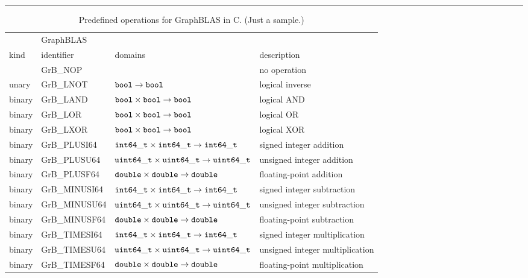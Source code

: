 \documentclass[11pt]{extarticle}
\begin{document}
\begin{table}
\hrule
\begin{center}
\caption{Predefined operations for GraphBLAS in C. (Just a sample.)
}
\label{Tab:PredefinedOperations}
\begin{tabular}{l|l|l|l}
		& GraphBLAS		&									& \\
kind		& identifier 		& domains								& description \\ \hline
		& {\sf GrB\_NOP}	& 									& no operation \\
unary		& {\sf GrB\_LNOT}	& ${\tt bool} \rightarrow {\tt bool}$      				& logical inverse \\
binary		& {\sf GrB\_LAND}	& ${\tt bool} \times {\tt bool} \rightarrow {\tt bool}$      		& logical AND \\
binary		& {\sf GrB\_LOR}	& ${\tt bool} \times {\tt bool} \rightarrow {\tt bool}$      		& logical OR \\
binary		& {\sf GrB\_LXOR}	& ${\tt bool} \times {\tt bool} \rightarrow {\tt bool}$      		& logical XOR \\
binary		& {\sf GrB\_PLUSI64}	& ${\tt int64\_t} \times {\tt int64\_t} \rightarrow {\tt int64\_t}$ 	& signed integer addition \\
binary		& {\sf GrB\_PLUSU64}	& ${\tt uint64\_t} \times {\tt uint64\_t} \rightarrow {\tt uint64\_t}$ 	& unsigned integer addition \\
binary		& {\sf GrB\_PLUSF64}	& ${\tt double} \times {\tt double} \rightarrow {\tt double}$ 		& floating-point addition \\
binary		& {\sf GrB\_MINUSI64}	& ${\tt int64\_t} \times {\tt int64\_t} \rightarrow {\tt int64\_t}$ 	& signed integer subtraction \\
binary		& {\sf GrB\_MINUSU64}	& ${\tt uint64\_t} \times {\tt uint64\_t} \rightarrow {\tt uint64\_t}$ 	& unsigned integer subtraction \\
binary		& {\sf GrB\_MINUSF64}	& ${\tt double} \times {\tt double} \rightarrow {\tt double}$ 		& floating-point subtraction \\
binary		& {\sf GrB\_TIMESI64}	& ${\tt int64\_t} \times {\tt int64\_t} \rightarrow {\tt int64\_t}$ 	& signed integer multiplication \\
binary		& {\sf GrB\_TIMESU64}	& ${\tt uint64\_t} \times {\tt uint64\_t} \rightarrow {\tt uint64\_t}$ 	& unsigned integer multiplication \\
binary		& {\sf GrB\_TIMESF64}	& ${\tt double} \times {\tt double} \rightarrow {\tt double}$ 		& floating-point multiplication \\

\end{tabular}
\end{center}
\end{table}
\end{document}
